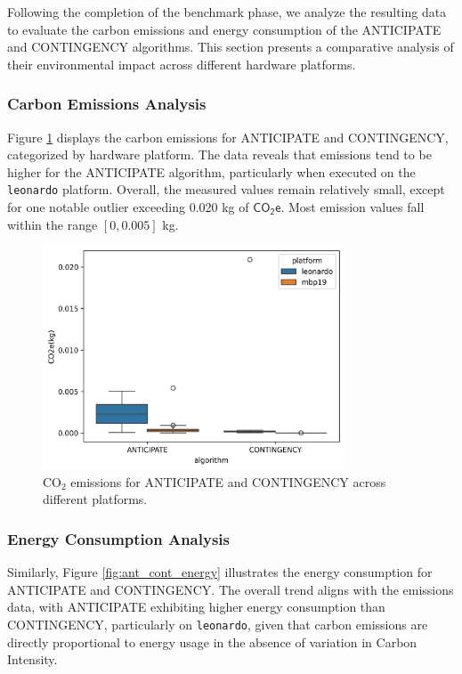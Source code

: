 \documentclass[a4paper,singleside,12pt]{report} %
\begin{document}
Following the completion of the benchmark phase, we analyze the resulting data to evaluate the carbon emissions and energy consumption of the ANTICIPATE and CONTINGENCY algorithms. This section 
presents a comparative analysis of their environmental impact across different hardware platforms.

\subsubsection{Carbon Emissions Analysis}

Figure \ref{fig:ant_cont_emissions} displays the carbon emissions for ANTICIPATE and CONTINGENCY, categorized by hardware platform. The data reveals that emissions tend to be higher for the 
ANTICIPATE algorithm, particularly when executed on the \verb|leonardo| platform. Overall, the measured values remain relatively small, except for one notable outlier exceeding 0.020 kg of 
$\mathsf{CO_2e}$. Most emission values fall within the range $[0,0.005]$ kg.

\begin{figure}[h!]
    \centering
    \includegraphics[width=0.8\textwidth]{imgs/emissions_ant_cont.png}
    \caption{CO$_2$ emissions for ANTICIPATE and CONTINGENCY across different platforms.}
    \label{fig:ant_cont_emissions}
\end{figure}

\subsubsection{Energy Consumption Analysis}

Similarly, Figure \ref{fig:ant_cont_energy} illustrates the energy consumption for ANTICIPATE and CONTINGENCY. The overall trend aligns with the emissions data, with ANTICIPATE exhibiting higher 
energy consumption than CONTINGENCY, particularly on \verb|leonardo|, given that carbon emissions are directly proportional to energy usage in the absence of variation in Carbon Intensity.
\end{document}
